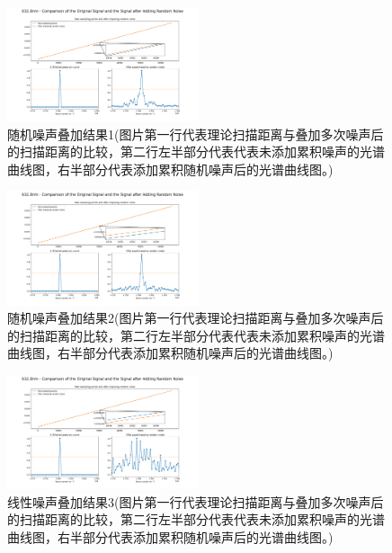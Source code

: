 \documentclass[conference]{IEEEtran}
\begin{document}
\begin{figure}[htbp]
    \centerline{\includegraphics[width=0.5\textwidth]{随机噪声叠加1.png}}
    \caption{随机噪声叠加结果1(图片第一行代表理论扫描距离与叠加多次噪声后的扫描距离的比较，第二行左半部分代表代表未添加累积噪声的光谱曲线图，右半部分代表添加累积随机噪声后的光谱曲线图。)}
    \label{pic21}
\end{figure}

\begin{figure}[htbp]
    \centerline{\includegraphics[width=0.5\textwidth]{随机噪声叠加2.png}}
    \caption{随机噪声叠加结果2(图片第一行代表理论扫描距离与叠加多次噪声后的扫描距离的比较，第二行左半部分代表代表未添加累积噪声的光谱曲线图，右半部分代表添加累积随机噪声后的光谱曲线图。)}
    \label{pic22}
\end{figure}

\begin{figure}[htbp]
    \centerline{\includegraphics[width=0.5\textwidth]{随机噪声叠加3.png}}
    \caption{线性噪声叠加结果3(图片第一行代表理论扫描距离与叠加多次噪声后的扫描距离的比较，第二行左半部分代表代表未添加累积噪声的光谱曲线图，右半部分代表添加累积随机噪声后的光谱曲线图。)}
    \label{pic23}
\end{figure}
\end{document}

